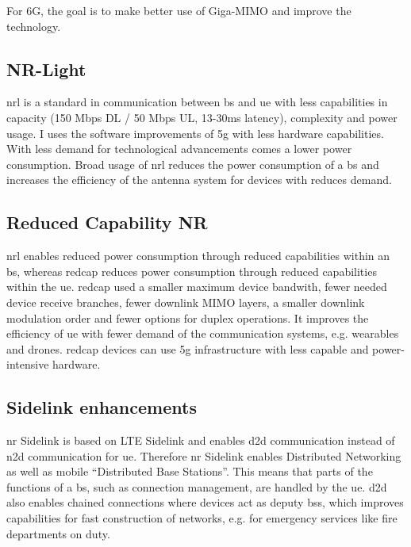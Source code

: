 \documentclass[11pt,a4paper]{article}
\begin{document}
For 6G, the goal is to make better use of Giga-MIMO and improve the technology.

\subsection{NR-Light}\label{subsec:nrlight}
\acrfull{nrl} is a standard in communication between \acrshort{bs} and \acrshort{ue} with less capabilities in capacity (150 Mbps DL / 50 Mbps UL, 13-30ms latency), complexity and power usage.
I uses the software improvements of \acrshort{5g} with less hardware capabilities.
With less demand for technological advancements comes a lower power consumption.
Broad usage of \acrshort{nrl} reduces the power consumption of a \acrlong{bs} and increases the efficiency of the antenna system for devices with reduces demand.

\subsection{Reduced Capability NR}\label{subsec:RedCap}
\acrshort{nrl} enables reduced power consumption through reduced capabilities within an \acrshort{bs}, whereas \acrfull{redcap} reduces power consumption through reduced capabilities within the \acrshort{ue}.
\acrshort{redcap} used a smaller maximum device bandwith, fewer needed device receive branches, fewer downlink MIMO layers, a smaller downlink modulation order and fewer options for duplex operations.
It improves the efficiency of \acrshort{ue} with fewer demand of the communication systems, e.g. wearables and drones.
\acrshort{redcap} devices can use \acrshort{5g} infrastructure with less capable and power-intensive hardware. 

\subsection{Sidelink enhancements}\label{subsec:sidelink}
\acrshort{nr} Sidelink is based on LTE Sidelink and enables \acrfull{d2d} communication instead of \acrfull{n2d} communication for \acrshort{ue}.
Therefore \acrshort{nr} Sidelink enables Distributed Networking as well as mobile \enquote{Distributed Base Stations}.
This means that parts of the functions of a \acrshort{bs}, such as connection management, are handled by the \acrshort{ue}.
\acrlong{d2d} also enables chained connections where devices act as deputy \acrlong{bs}s, which improves capabilities for fast construction of networks, e.g. for emergency services like fire departments on duty.
\end{document}
